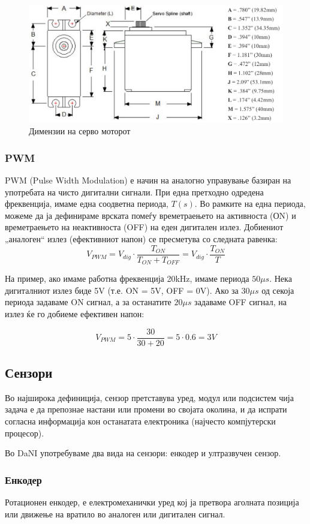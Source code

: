 \documentclass{article}
\begin{document}
\begin{figure}[H]
\includegraphics[width=0.75\linewidth]{servo_schematic.png}
\centering
\caption{Димензии на серво моторот}
\label{fig:servo_schematic.png}
\end{figure}

\subsubsection{PWM}
PWM (Pulse Width Modulation) е начин на аналогно управување базиран на употребата на чисто дигитални сигнали. При една претходно одредена фреквенција, имаме една соодветна периода, $T(s)$. Во рамките на една периода, можеме да ја дефинираме врската помеѓу времетраењето на активноста (ОN) и времетраењето на неактивноста (OFF) на еден дигитален излез. Добиениот „аналоген“ излез (ефективниот напон) се пресметува со следната равенка:\\

$$ V_{PWM} = V_{dig} \cdot \frac{T_{ON}}{T_{ON} + T_{OFF}} = V_{dig} \cdot \frac{T_{ON}}{T} $$

На пример, ако имаме работна фреквенција 20kHz, имаме периода $50\mu s$. Нека дигиталниот излез биде 5V (т.е. ON = 5V, OFF = 0V). Ако за $30\mu s$ од секоја периода задаваме ON сигнал, а за останатите $20\mu s$ задаваме OFF сигнал, на излез ќе го добиеме ефективен напон:

$$ V_{PWM} = 5 \cdot \frac{30}{30+20} = 5 \cdot 0.6 = 3V $$

\subsection{Сензори}
Во најширока дефиниција, сензор претставува уред, модул или подсистем чија задача е да препознае настани или промени во својата околина, и да испрати согласна информација кон останатата електроника (најчесто компјутерски процесор).

Во DaNI употребуваме два вида на сензори: енкодер и ултразвучен сензор.

\subsubsection{Енкодер}
Ротационен енкодер, е електромеханички уред кој ја претвора аголната позиција или движење на вратило во аналоген или дигитален сигнал.
\end{document}
